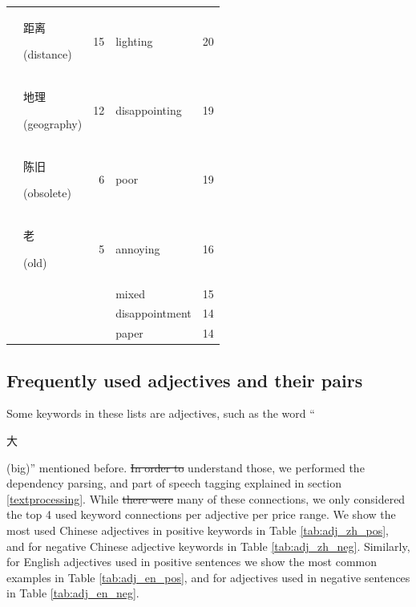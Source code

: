 \documentclass[smallextended,natbib]{svjour3}       %
\providecommand{\DIFadd}[1]{{\protect\color{blue}\uwave{#1}}} %
\providecommand{\DIFdel}[1]{{\protect\color{red}\sout{#1}}}                      %
\providecommand{\DIFaddbegin}{} %
\providecommand{\DIFaddend}{} %
\providecommand{\DIFdelbegin}{} %
\providecommand{\DIFdelend}{} %
\newcommand{\DIFscaledelfig}{0.5}
\newlength{\DIFdelgraphicswidth} %
\newlength{\DIFdelgraphicsheight} %
\newcommand{\DIFaddincludegraphics}[2][]{{\color{blue}\fbox{\DIFOincludegraphics[#1]{#2}}}} %
\newcommand{\DIFdelincludegraphics}[2][]{%
\sbox{\DIFdelgraphicsbox}{\DIFOincludegraphics[#1]{#2}}%
\settoboxwidth{\DIFdelgraphicswidth}{\DIFdelgraphicsbox} %
\settoboxtotalheight{\DIFdelgraphicsheight}{\DIFdelgraphicsbox} %
\scalebox{\DIFscaledelfig}{%
\parbox[b]{\DIFdelgraphicswidth}{\usebox{\DIFdelgraphicsbox}\\[-\baselineskip] \rule{\DIFdelgraphicswidth}{0em}}\llap{\resizebox{\DIFdelgraphicswidth}{\DIFdelgraphicsheight}{%
\setlength{\unitlength}{\DIFdelgraphicswidth}%
\begin{picture}(1,1)%
\thicklines\linethickness{2pt} %
{\color[rgb]{1,0,0}\put(0,0){\framebox(1,1){}}}%
{\color[rgb]{1,0,0}\put(0,0){\line( 1,1){1}}}%
{\color[rgb]{1,0,0}\put(0,1){\line(1,-1){1}}}%
\end{picture}%
}\hspace*{3pt}}} %
} %
\DeclareRobustCommand{\DIFaddbegin}{\DIFOaddbegin \let\includegraphics\DIFaddincludegraphics} %
\DeclareRobustCommand{\DIFaddend}{\DIFOaddend \let\includegraphics\DIFOincludegraphics} %
\DeclareRobustCommand{\DIFdelbegin}{\DIFOdelbegin \let\includegraphics\DIFdelincludegraphics} %
\DeclareRobustCommand{\DIFdelend}{\DIFOaddend \let\includegraphics\DIFOincludegraphics} %
\begin{document}
\begin{table}[ht]
{\begin{tabular}{|c|lr|lr|}
                                                             & \begin{CJK}{UTF8}{gbsn}距离\end{CJK} (distance)  & 15   & lighting       & 20  \\  
                                                             & \begin{CJK}{UTF8}{gbsn}地理\end{CJK} (geography) & 12   & disappointing  & 19  \\  
                                                             & \begin{CJK}{UTF8}{gbsn}陈旧\end{CJK} (obsolete)  & 6    & poor           & 19  \\  
                                                             & \begin{CJK}{UTF8}{gbsn}老\end{CJK} (old)        & 5    & annoying       & 16  \\  
                                                             &                                                &      & mixed          & 15  \\  
                                                             &                                                &      & disappointment & 14  \\  
                                                             &                                                &      & paper          & 14  \\ \hline
        \end{tabular}%
        }
    \end{table}

  \subsection{Frequently used adjectives and their pairs}\label{adjresults}

    Some keywords in these lists are adjectives, such as the word ``\begin{CJK}{UTF8}{gbsn}大\end{CJK} (big)'' mentioned before. \DIFdelbegin \DIFdel{In order to }\DIFdelend \DIFaddbegin \DIFadd{To }\DIFaddend understand those, we performed the dependency parsing, and part of speech tagging explained in section \ref{textprocessing}. While \DIFdelbegin \DIFdel{there were }\DIFdelend many of these connections, we only considered the top 4 used keyword connections per adjective per price range. We show the most used Chinese adjectives in positive keywords in Table \ref{tab:adj_zh_pos}, and for negative Chinese adjective keywords in Table \ref{tab:adj_zh_neg}. Similarly, for English adjectives used in positive sentences we show the most common examples in Table \ref{tab:adj_en_pos}, and for adjectives used in negative sentences in Table \ref{tab:adj_en_neg}.
\end{document}
